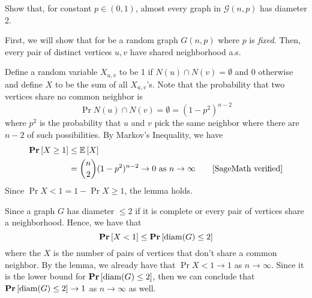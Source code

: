 \question Show that, for constant \(p \in(0,1)\), almost every
  graph in \(\mathcal{G}(n, p)\) has diameter 2.

\begin{solution}
  First, we will show that for be a random graph \(G(n, p)\)
  where \(p\) is \textit{fixed}. Then, every pair of distinct 
  vertices $u, v$ have shared neighborhood a.s.

  Define a random variable $X_{u, v}$ to be 1 if $N(u) \cap N(v)
  = \emptyset$ and 0 otherwise and define $X$ to be the sum of all
  $X_{u, v}$'s. Note that the probability that two vertices share 
  no common neighbor is
  \[ \Pr{N(u) \cap N(v) = \emptyset} = (1-p^2)^{n-2} \]
  where $p^2$ is the probability that $u$ and $v$ pick the same
  neighbor where there are $n-2$ of such possibilities.
  By Markov's Inequality, we have
  \[
  \begin{aligned}
    \mathbf{Pr}\left[X \geq 1\right] &\leq \mathbb{E}\left[X\right] \\
                  &= \binom{n}{2}(1-p^2)^{n-2} \to 0 \text{ as } n \to \infty \qquad \text{[SageMath verified]}
  \end{aligned}
  \]
  Since $\Pr{X < 1} = 1 - \Pr{X \geq 1}$, the lemma holds.

  Since a graph \(G\) has diameter \(\leq 2\) if it is
  complete or every pair of vertices share a neighborhood.
  Hence, we have that
  \[ \mathbf{Pr}\left[X < 1\right] \leq \mathbf{Pr}\left[\operatorname{diam}(G) \leq 2\right] \]
  where the \(X\) is the number of pairs of vertices that don't
  share a common neighbor. By the lemma, we already have that
  \(\Pr{X < 1} \to 1\) as \(n \to \infty\). Since it is the lower
  bound for \(\mathbf{Pr}\left[\operatorname{diam}(G) \leq 2\right]\), then we can conclude that
  \( \mathbf{Pr}\left[\operatorname{diam}(G) \leq 2\right] \to 1 \) as \(n \to \infty\) as well.
\end{solution}
